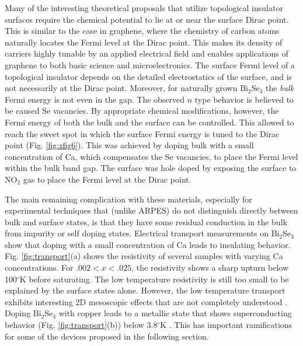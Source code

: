 \documentclass[twocolumn,floatfix,showpacs,rmp,aps]{revtex4}
\begin{document}
	Many of the interesting theoretical proposals that utilize
	topological insulator surfaces
	require the chemical potential to lie at or near the surface Dirac point.
	This is similar to the case in graphene, where
	the chemistry of carbon atoms naturally locates the Fermi
	level at the Dirac point.   This makes its
	density of carriers highly tunable by an applied electrical field and
	enables applications of graphene to both basic science and
	microelectronics.  The surface Fermi level of a topological insulator
	depends on the detailed electrostatics of the surface, and is not necessarily
	at the Dirac point.  Moreover, for naturally grown Bi$_2$Se$_3$ the {\it bulk} Fermi
	energy is not even in the gap.  The observed $n$ type behavior is believed to
	be caused Se vacancies.  By appropriate chemical modifications, however, the
	Fermi energy of both the bulk and the surface can be controlled.
	This allowed \textcite{hsieh09b} to reach the sweet spot in which the surface
	Fermi energy is tuned to the Dirac point (Fig. \ref{fig:zfig6}).  This
	was achieved by doping bulk
	with a small concentration of Ca,
	which compensates the Se vacancies, to place the Fermi level within
	the bulk band gap.  The surface was hole doped by exposing the
	surface to NO$_2$ gas to place the Fermi level at the Dirac point.
	
	The main remaining complication with these materials, especially for
	experimental techniques that (unlike ARPES) do not distinguish
	directly between bulk and surface states, is that they have some
	residual conduction in the bulk from impurity or self doping states.
	Electrical transport measurements on Bi$_2$Se$_3$ show that doping with a small
	concentration of Ca leads to insulating behavior.  Fig. \ref{fig:transport}(a)
	shows the resistivity of several samples with varying Ca concentrations.  For
	$.002<x<.025$, the resistivity shows a sharp upturn below 100$^\circ$K before
	saturating.  The low temperature resistivity is still too small to be explained by
	the surface states alone.  However, the low temperature transport exhibits
	interesting 2D mesoscopic effects that are not completely
	understood \cite{checkelsky09}.   Doping Bi$_2$Se$_3$ with copper leads to a
	metallic state that shows superconducting behavior (Fig.
	\ref{fig:transport}(b)) below 3.8$^\circ$K \cite{hor10a,wray09}.  This has important
	ramifications for some of the devices proposed in the following section.
	
\end{document}
